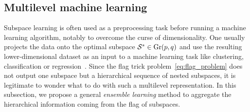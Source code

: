 \subsection{Multilevel machine learning}
Subspace learning is often used as a preprocessing task before running a machine learning algorithm, notably to overcome the curse of dimensionality. One usually projects the data onto the optimal subspace $\mathcal{S}^* \in \operatorname{Gr}(p, q)$ and use the resulting lower-dimensional dataset as an input to a machine learning task like clustering, classification or regression~\citep{bouveyron_model-based_2019}. Since the flag trick problem~\eqref{eq:flag_problem} does not output one subspace but a hierarchical sequence of nested subspaces, it is legitimate to wonder what to do with such a multilevel representation.
In this subsection, we propose a general \textit{ensemble learning} method to aggregate the hierarchical information coming from the flag of subspaces.

